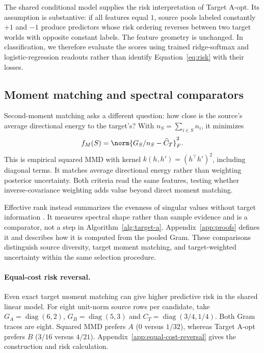 The shared conditional model supplies the risk interpretation of Target A-opt. Its assumption is substantive: if all features equal $1$, source pools labeled constantly $+1$ and $-1$ produce predictors whose risk ordering reverses between two target worlds with opposite constant labels. The feature geometry is unchanged. In classification, we therefore evaluate the scores using trained ridge-softmax and logistic-regression readouts rather than identify Equation~\eqref{eq:risk} with their losses.

\subsection{Moment matching and spectral comparators}
Second-moment matching asks a different question: how close is the source's average directional energy to the target's? With $n_S=\sum_{i\in S}n_i$, it minimizes
\begin{equation}
 f_M(S)=\norm{G_S/n_S-\widehat C_T}_F^2.
 \label{eq:mmd}
\end{equation}
This is empirical squared MMD with kernel $k(h,h')=(h^\top h')^2$, including diagonal terms. It matches average directional energy rather than weighting posterior uncertainty. Both criteria read the same features, testing whether inverse-covariance weighting adds value beyond direct moment matching.

Effective rank instead summarizes the evenness of singular values without target information \citep{roy2007}. It measures spectral shape rather than sample evidence and is a comparator, not a step in Algorithm~\ref{alg:target-a}. Appendix~\ref{app:proofs} defines it and describes how it is computed from the pooled Gram. These comparisons distinguish source diversity, target moment matching, and target-weighted uncertainty within the same selection procedure.

\paragraph{Equal-cost risk reversal.}
Even exact target moment matching can give higher predictive risk in the shared linear model. For eight unit-norm source rows per candidate, take $G_A=\operatorname{diag}(6,2)$, $G_B=\operatorname{diag}(5,3)$ and $C_T=\operatorname{diag}(3/4,1/4)$. Both Gram traces are eight. Squared MMD prefers $A$ ($0$ versus $1/32$), whereas Target A-opt prefers $B$ ($3/16$ versus $4/21$). Appendix~\ref{app:equal-cost-reversal} gives the construction and risk calculation.

